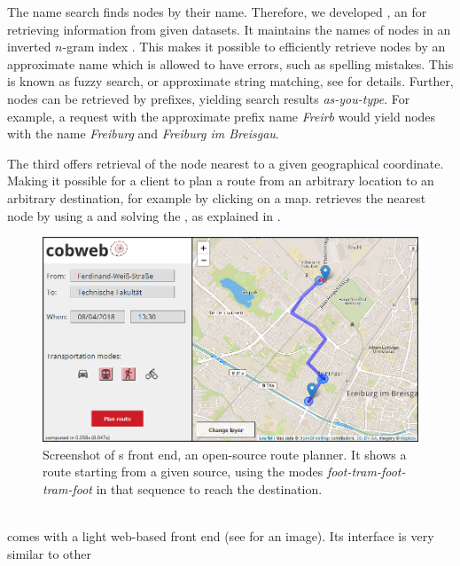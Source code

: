 	The name search \api finds \osm nodes by their name. Therefore, we developed \lexiSearch {}, an \api for retrieving
	information from given datasets.
	It maintains the names of \osm nodes in an inverted $n$-gram index . This makes it possible to efficiently
	retrieve nodes by an approximate name which is allowed to have errors, such as spelling mistakes. This is known as fuzzy search, or
	approximate string matching, see  for details. Further, nodes can be retrieved by prefixes, yielding search
	results \textit{as-you-type}. For example, a request with the approximate prefix name \textit{Freirb} would yield nodes with
	the name \textit{Freiburg} and \textit{Freiburg im Breisgau}.
	
	The third \api offers retrieval of the \osm node nearest to a given geographical coordinate. Making it possible for a client to plan a
	route from an arbitrary location to an arbitrary destination, for example by clicking on a map. \cobweb retrieves the nearest node by
	using a \coverTree and solving the \nearestNeighborProblem, as explained in .\\
	\begin{figure}[!ht]
		 \begin{center}
			\includegraphics[scale=0.5]{res/cobweb_frontend}
		\end{center}
		\caption{Screenshot of {\cobweb}s  front end, an open-source \multiModal route planner. It shows a \multiModal
		route starting from a given source, using the modes \textit{foot-tram-foot-tram-foot} in that sequence to reach the destination.}
		\label{cobweb_frontend}
	\end{figure}\quad\\
	\cobweb comes with a light web-based front end (see  for an image). Its interface is very similar to other
